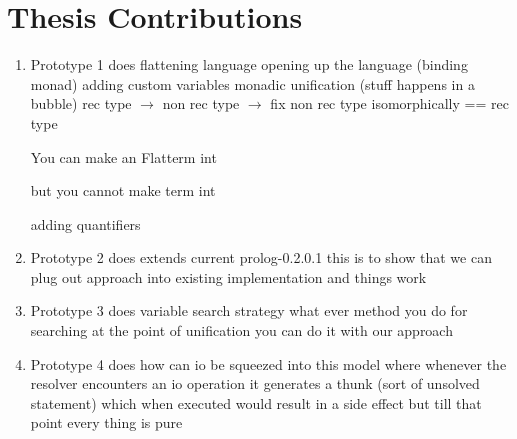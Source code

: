 \documentclass[thesis-solanki.tex]{subfiles}
\begin{document}
\section{Thesis Contributions}

\begin{enumerate}
\item Prototype 1 does
flattening language
opening up the language (binding monad)
adding custom variables
monadic unification (stuff happens in a bubble)
rec type $\rightarrow$ non rec type $\rightarrow$ fix non rec type isomorphically == rec type

You can make an Flatterm int

but you cannot make term int

adding quantifiers


\item Prototype 2 does
extends current prolog-0.2.0.1
this is to show that we can plug out approach into existing implementation and things work

\item Prototype 3 does
variable search strategy
what ever method you do for searching at the point of unification you can do it with our approach

\item Prototype 4 does
how can io be squeezed into this model where whenever the resolver encounters an io operation it generates a thunk (sort of unsolved
statement) which when executed would result in a side effect but till that point every thing is pure

\end{enumerate}
\end{document}
